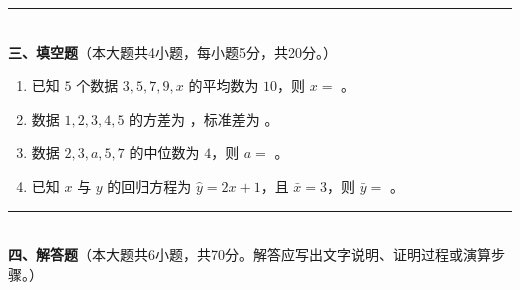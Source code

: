 \documentclass[12pt, a4paper]{ctexart}
\begin{document}
\vspace{6pt}

\noindent\rule{\textwidth}{0.4pt}\\[2pt]
{\large\bfseries 三、填空题}（本大题共4小题，每小题5分，共20分。）

\vspace{6pt}

\begin{enumerate}[resume]
\item 已知 $5$ 个数据 $3,5,7,9,x$ 的平均数为 $10$，则 $x=$ \underline{\hspace{2cm}}。

\item 数据 $1,2,3,4,5$ 的方差为 \underline{\hspace{2cm}}，标准差为 \underline{\hspace{2cm}}。

\item 数据 $2,3,a,5,7$ 的中位数为 $4$，则 $a=$ \underline{\hspace{2cm}}。

\item 已知 $x$ 与 $y$ 的回归方程为 $\hat{y}=2x+1$，且 $\bar{x}=3$，则 $\bar{y}=$ \underline{\hspace{2cm}}。
\end{enumerate}

\vspace{6pt}

\noindent\rule{\textwidth}{0.4pt}\\[2pt]
{\large\bfseries 四、解答题}（本大题共6小题，共70分。解答应写出文字说明、证明过程或演算步骤。）

\vspace{6pt}
\end{document}
